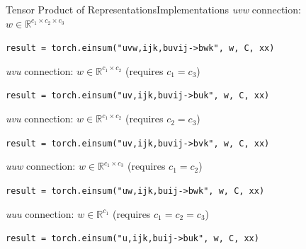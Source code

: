 \documentclass[pdf,serif]{beamer}
\newcommand{\empr}[1]{{\color{BerkeleyBlue}\emph{#1}}}
\begin{document}
\begin{frame}[fragile]{Tensor Product of Representations}{Implementations}
    \small
    \empr{uvw} connection: $w\in \mathbb R^{c_1\times c_2\times c_3}$
    \vspace*{0.5em}
    \begin{mdframed}
        \texttt{result = torch.einsum("uvw,ijk,buvij->bwk", w, C, xx)}
    \end{mdframed}

    \empr{uvu} connection: $w\in \mathbb R^{c_1\times c_2}$ (requires $c_1=c_3$)
    \vspace*{0.5em}
    \begin{mdframed}
        \texttt{result = torch.einsum("uv,ijk,buvij->buk", w, C, xx)}
    \end{mdframed}

    \empr{uvu} connection: $w\in \mathbb R^{c_1\times c_2}$ (requires $c_2=c_3$)
    \vspace*{0.5em}
    \begin{mdframed}
        \texttt{result = torch.einsum("uv,ijk,buvij->bvk", w, C, xx)}
    \end{mdframed}

    \empr{uuw} connection: $w\in \mathbb R^{c_1\times c_3}$ (requires $c_1=c_2$)
    \vspace*{0.5em}
    \begin{mdframed}
        \texttt{result = torch.einsum("uw,ijk,buij->bwk", w, C, xx)}
    \end{mdframed}

    \empr{uuu} connection: $w\in \mathbb R^{c_1}$ (requires $c_1=c_2=c_3$)
    \vspace*{0.5em}
    \begin{mdframed}
        \texttt{result = torch.einsum("u,ijk,buij->buk", w, C, xx)}
    \end{mdframed}
    
\end{frame}
\end{document}
